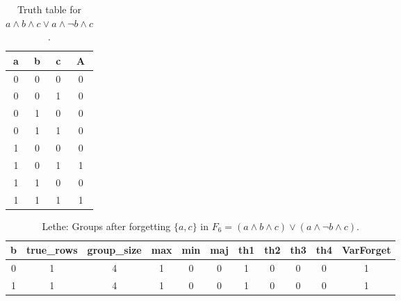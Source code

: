 \begin{table}[!tb]
    \centering
    \begin{tabular}{|c|c|c|c|}
        \hline
        \textbf{a} & \textbf{b} & \textbf{c} & \textbf{A} \\ \hline
        0 & 0 & 0 & 0 \\ \hline
        0 & 0 & 1 & 0 \\ \hline
        0 & 1 & 0 & 0 \\ \hline
        0 & 1 & 1 & 0 \\ \hline
        1 & 0 & 0 & 0 \\ \hline
        1 & 0 & 1 & 1 \\ \hline
        1 & 1 & 0 & 0 \\ \hline
        1 & 1 & 1 & 1 \\ \hline
    \end{tabular}
    \caption{Truth table for $a \land b \land c \lor a \land \lnot b \land c$.}
    \label{tab:truthtab}
\end{table}

\begin{table}[!tb]
    \centering
    \begin{tabular}{|c|c|c|c|c|c|c|c|c|c|c|}
        \hline
        \textbf{b} & \textbf{true\_rows} & \textbf{group\_size} & \textbf{max} & \textbf{min} & \textbf{maj} & \textbf{th1} & \textbf{th2} & \textbf{th3} & \textbf{th4} & \textbf{VarForget} \\ \hline
        \rowcolor{gray!40} 0 & 1 & 4 & 1 & 0 & 0 & 1 & 0 & 0 & 0 & 1 \\ \hline
        \rowcolor{blue!40} 1 & 1 & 4 & 1 & 0 & 0 & 1 & 0 & 0 & 0 & 1 \\ \hline
    \end{tabular}
    \caption{Lethe: Groups after forgetting $\{a, c\}$ in $F_{6} = (a \land b \land c) \lor (a \land \lnot b \land c)$.}
    \label{tab:lethe-F6-ac-groups}
\end{table}
